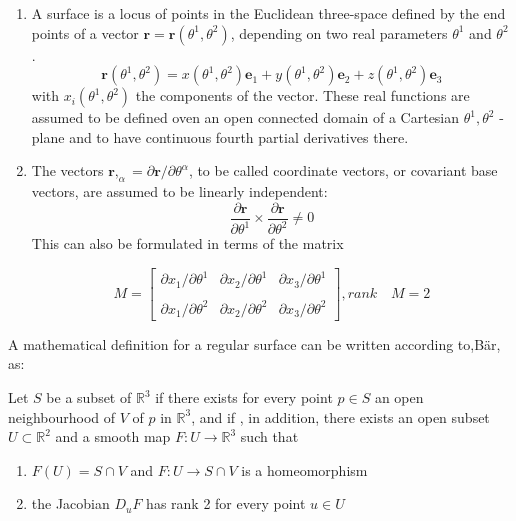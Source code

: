  \renewcommand{\labelenumii}{\Roman{enumii}}
 \begin{enumerate}
 \item A surface is a locus of points in the Euclidean three-space defined by the end points of a vector $\textbf{r} = \textbf{r}(\theta^1 ,\theta^2)$, depending on two real parameters $\theta^1$ and $\theta^2$.
 \begin{equation}
 \textbf{r}(\theta^1,\theta^2) = x(\theta^1,\theta^2)\textbf{e}_1 +  y(\theta^1,\theta^2)\textbf{e}_2+  z(\theta^1,\theta^2)\textbf{e}_3
 \end{equation}
 with $x_i(\theta^1,\theta^2)$ the components of the vector. These real functions are assumed to be defined oven an open connected domain of a Cartesian $\theta^1, \theta^2$ - plane and to have continuous fourth partial derivatives there.
 \item The vectors $\textbf{r},_\alpha = \partial\textbf{r}/\partial \theta^\alpha $, to be called coordinate vectors, or covariant base vectors, are assumed to be linearly independent:
 \begin{equation}
 \frac{\partial\textbf{r}}{\partial \theta^1} \times  \frac{\partial\textbf{r}}{\partial \theta^2} \neq 0
 \end{equation}
 This can also be formulated in terms of the matrix
 

\[M =
\begin{bmatrix}
    \partial x_1/ \partial\theta^1 & \partial x_2/ \partial\theta^1 & \partial x_3/ \partial\theta^1\\
    \\
    \partial x_1/ \partial\theta^2 & \partial x_2/ \partial\theta^2 & \partial x_3/ \partial\theta^2
\end{bmatrix} , rank \quad M = 2
\]
 
 \end{enumerate}

A mathematical definition for a regular surface can be written according to,Bär, as:

\vspace{5mm} %

Let $S$  be a subset of $\mathbb{R}^3$ if there exists for every point $p \in S$ an open neighbourhood of $V$  of $p$ in $\mathbb{R}^3$, and if , in addition, there exists an open subset $U \subset \mathbb{R}^2$ and a smooth map $F:U \rightarrow \mathbb{R}^3$ such that
 
\begin{enumerate}
\item $ F(U) = S \cap V$  and $F:U \rightarrow S \cap V$ is a homeomorphism 
\item  the Jacobian $D_u F$ has rank 2 for every point $u \in U$  

\end{enumerate}


